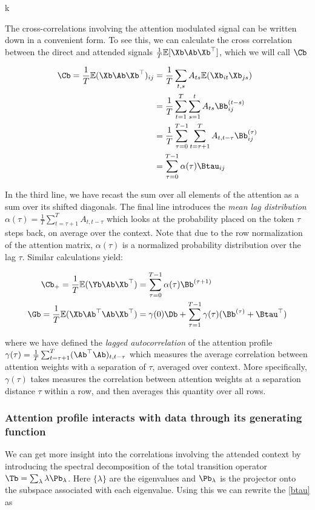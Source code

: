k\documentclass{article}
\begin{document}
The cross-correlations involving the attention modulated signal can be written down in a convenient form. To see this, we can calculate the cross correlation between the direct and attended signals $\frac{1}{T}\mathbb{E}[\Xb \Ab \Xb^\top]$, which we will call $\Cb$

\begin{align}
    \Cb = \frac{1}{T}\mathbb{E}(\Xb \Ab\Xb^\top)_{ij} &= \frac{1}{T}\sum_{t,s} A_{ts}\mathbb{E}(\Xb_{it}\Xb_{js}) \\
    &= \frac{1}{T}\sum_{t=1}^T\sum_{s=1}^t A_{ts} \Bb^{(t-s)}_{ij}\\
    &= \frac{1}{T}\sum_{\tau=0}^{T-1}\sum_{t = \tau+1}^T A_{t, t-\tau} \Bb^{(\tau)}_{ij} \\
 &= \sum_{\tau=0}^{T-1} \alpha(\tau) \Btau_{ij} \label{XAX}
\end{align}

In the third line, we have recast the sum over all elements of the attention as a sum over its shifted diagonals. The final line introduces the \textit{mean lag distribution} $\alpha(\tau) = \frac{1}{T}\sum_{t = \tau+1}^T A_{t,t-\tau}$ which looks at the probability placed on the token $\tau$ steps back, on average over the context. Note that due to the row normalization of the attention matrix, $\alpha(\tau)$ is a normalized probability distribution over the lag $\tau$. Similar calculations yield:



\begin{align}
    \Cb_{+} = \frac{1}{T}\mathbb{E}(\Yb \Ab \Xb^\top) &= \sum_{\tau=0}^{T-1} \alpha(\tau) \Bb^{(\tau+1)} \label{YAX}\\
    \Gb = \frac{1}{T}\mathbb{E}(\Xb \Ab^\top \Ab \Xb^\top) &= \gamma(0) \Db + \sum_{\tau=1}^{T-1} \gamma(\tau) (\Bb^{(\tau)} + {\Btau}^\top) \label{XAAX}
\end{align}

where we have defined the \textit{lagged autocorrelation} of the attention profile $\gamma(\tau) = \frac{1}{T}\sum_{t=\tau+1}^T(\Ab^\top\Ab)_{t, t-\tau}$ which measures the average correlation between attention weights with a separation of $\tau$, averaged over context. More specifically, $\gamma(\tau)$ takes measures the correlation between attention weights at a separation distance $\tau$ within a row, and then averages this quantity over all rows. 

\subsubsection{Attention profile interacts with data through its generating function}
We can get more insight into the correlations involving the attended context by introducing the spectral decomposition of the total transition operator $\Tb = \sum_{\lambda} \lambda \Pb_{\lambda}$. Here $\{\lambda\}$ are the eigenvalues and $\Pb_\lambda$ is the projector onto the subspace associated with each eigenvalue. Using this we can rewrite the \eqref{btau} as 
\end{document}

